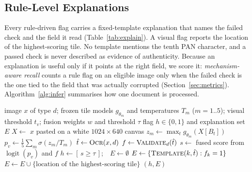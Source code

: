 \documentclass[VANCOUVER,Times1COL]{WileyNJDv5}
\begin{document}
\subsection{Rule-Level Explanations}
\label{subsec:explanations}

Every rule-driven flag carries a fixed-template explanation that names
the failed check and the field it read (Table~\ref{tab:explain}). A
visual flag reports the location of the highest-scoring tile. No
template mentions the tenth PAN character, and a passed check is never
described as evidence of authenticity. Because an explanation is useful
only if it points at the right field, we score it:
\emph{mechanism-aware recall} counts a rule flag on an eligible image
only when the failed check is the one tied to the field that was
actually corrupted (Section~\ref{sec:metrics}).
Algorithm~\ref{alg:infer} summarises how one document is processed.

\begin{algorithm}[!t]
\caption{Verification of one document image}
\label{alg:infer}
\begin{algorithmic}[1]
\Require image $x$ of type $d$; frozen tile models $g_{\theta_m}$ and
  temperatures $T_m$ ($m=1..5$); visual threshold $t_v$; fusion weights
  $w$ and threshold $\tau$
\Ensure flag $h\in\{0,1\}$ and explanation set $E$
\State $X\gets$ $x$ pasted on a white $1024{\times}640$ canvas
  \State $z_m\gets\max_t g_{\theta_m}(X[B_t])$ \Comment{(\ref{eq:maxtile})}
\EndFor
\State $p_v\gets\frac{1}{5}\sum_m\sigma(z_m/T_m)$ \Comment{(\ref{eq:calib})}
\State $\hat t\gets\textsc{Ocr}(x,d)$ 
\State $f\gets\textsc{Validate}_d(\hat t)$ 
\State $s\gets$ fused score from $\operatorname{logit}(p_v)$ and $f$ 
\State $h\gets[\,s\ge\tau\,]$;\ \ $E\gets\emptyset$
  \State $E\gets\{\textsc{Template}(k,\hat t): f_k=1\}$ 
    \State $E\gets E\cup\{\text{location of the highest-scoring tile}\}$
  \EndIf
\EndIf
\State \Return $(h,E)$
\end{algorithmic}
\end{algorithm}
\end{document}
